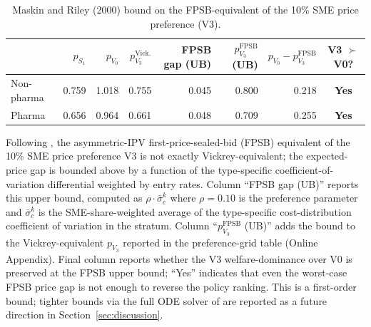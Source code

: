 \begin{table}[!htbp]
\centering
\begin{threeparttable}
\caption{Maskin and Riley (2000) bound on the FPSB-equivalent of the 10\% SME price preference (V3).}
\label{tab:maskin_riley_bound}
\small
\setlength{\tabcolsep}{4pt}
\begin{tabular}{lrrrrrrc}
\toprule
 & $p_{S_1}$ & $p_{V_0}$ & $p_{V_3}^{\text{Vick.}}$ & FPSB gap (UB) & $p_{V_3}^{\text{FPSB}}$ (UB) & $p_{V_0} - p_{V_3}^{\text{FPSB}}$ & V3 $\succ$ V0? \\
\midrule
Non-pharma & 0.759 & 1.018 & 0.755 & 0.045 & 0.800 & 0.218 & \textbf{Yes} \\
Pharma & 0.656 & 0.964 & 0.661 & 0.048 & 0.709 & 0.255 & \textbf{Yes} \\
\bottomrule
\end{tabular}
\begin{tablenotes}[flushleft]\footnotesize
\item Following \citet{maskinriley2000}, the asymmetric-IPV first-price-sealed-bid (FPSB) equivalent of the 10\% SME price preference V3 is not exactly Vickrey-equivalent; the expected-price gap is bounded above by a function of the type-specific coefficient-of-variation differential weighted by entry rates. Column ``FPSB gap (UB)'' reports this upper bound, computed as $\rho \cdot \bar\sigma_c^k$ where $\rho = 0.10$ is the preference parameter and $\bar\sigma_c^k$ is the SME-share-weighted average of the type-specific cost-distribution coefficient of variation in the stratum. Column ``$p_{V_3}^{\text{FPSB}}$ (UB)'' adds the bound to the Vickrey-equivalent $p_{V_3}$ reported in the preference-grid table (Online Appendix). Final column reports whether the V3 welfare-dominance over V0 is preserved at the FPSB upper bound; ``Yes'' indicates that even the worst-case FPSB price gap is not enough to reverse the policy ranking. This is a first-order bound; tighter bounds via the full ODE solver of \citet{lebrun1999} are reported as a future direction in Section~\ref{sec:discussion}.
\end{tablenotes}
\end{threeparttable}
\end{table}
